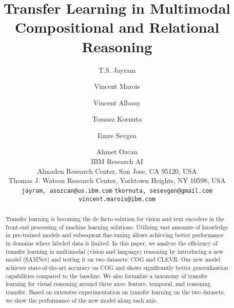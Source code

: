 \documentclass[10pt,twocolumn,letterpaper]{article}
\theoremstyle{remark}
\begin{document}
\title{Transfer Learning in Multimodal Compositional and Relational Reasoning}

\author{T.S. Jayram \and  Vincent Marois \and Vincent Albouy \and Tomasz Kornuta  \and Emre Sevgen \and Ahmet Ozcan\\
IBM Research AI\\
Almaden Research Center, San Jose, CA 95120, USA\\
Thomas J. Watson Research Center, Yorktown Heights, NY 10598, USA\\
{\tt\small {jayram,  asozcan}@us.ibm.com}
{\tt\small {tkornuta, sesevgen}@gmail.com}
{\tt\small vincent.marois@ibm.com}
}

\maketitle

\begin{abstract}
  Transfer learning is becoming the de facto solution for vision and text encoders in the front-end processing of machine learning solutions. Utilizing vast amounts of knowledge in pre-trained models and subsequent fine-tuning allows achieving better performance in domains where labeled data is limited. In this paper, we analyze the efficiency of transfer learning in multimodal (vision and language) reasoning by introducing a new model (SAMNet) and testing it on two datasets: COG and CLEVR.  Our new model achieves state-of-the-art accuracy on COG and shows significantly better generalization capabilities compared to the baseline. We also formalize a taxonomy of transfer learning for visual reasoning around three axes: feature, temporal, and reasoning transfer. Based on extensive experimentation on transfer learning on the two datasets, we show the performance of the new model along each axis.
\end{abstract}













\clearpage
{\small


}

%
\end{document}
